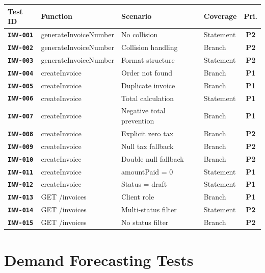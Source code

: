 \documentclass[12pt,a4paper]{report}
\newcommand{\testid}[1]{\texttt{\textbf{\color{secondary}#1}}}
\newcommand{\pone}{\textbf{\color{p1red}P1}}
\newcommand{\ptwo}{\textbf{\color{p2orange}P2}}
\begin{document}
\begin{longtable}{p{2cm}p{3.5cm}p{5cm}p{1.5cm}c}
  \toprule
  \textbf{Test ID} & \textbf{Function} & \textbf{Scenario} & \textbf{Coverage} & \textbf{Pri.} \\
  \midrule
  \endhead
  \testid{INV-001} & generateInvoiceNumber & No collision & Statement & \ptwo \\
  \testid{INV-002} & generateInvoiceNumber & Collision handling & Branch & \ptwo \\
  \testid{INV-003} & generateInvoiceNumber & Format structure & Statement & \ptwo \\
  \testid{INV-004} & createInvoice & Order not found & Branch & \pone \\
  \testid{INV-005} & createInvoice & Duplicate invoice & Branch & \pone \\
  \testid{INV-006} & createInvoice & Total calculation & Statement & \pone \\
  \testid{INV-007} & createInvoice & Negative total prevention & Branch & \pone \\
  \testid{INV-008} & createInvoice & Explicit zero tax & Branch & \ptwo \\
  \testid{INV-009} & createInvoice & Null tax fallback & Branch & \ptwo \\
  \testid{INV-010} & createInvoice & Double null fallback & Branch & \ptwo \\
  \testid{INV-011} & createInvoice & amountPaid = 0 & Statement & \pone \\
  \testid{INV-012} & createInvoice & Status = draft & Statement & \pone \\
  \testid{INV-013} & GET /invoices & Client role & Branch & \pone \\
  \testid{INV-014} & GET /invoices & Multi-status filter & Statement & \ptwo \\
  \testid{INV-015} & GET /invoices & No status filter & Branch & \ptwo \\
  \bottomrule
\end{longtable}

\section{Demand Forecasting Tests}
\end{document}
